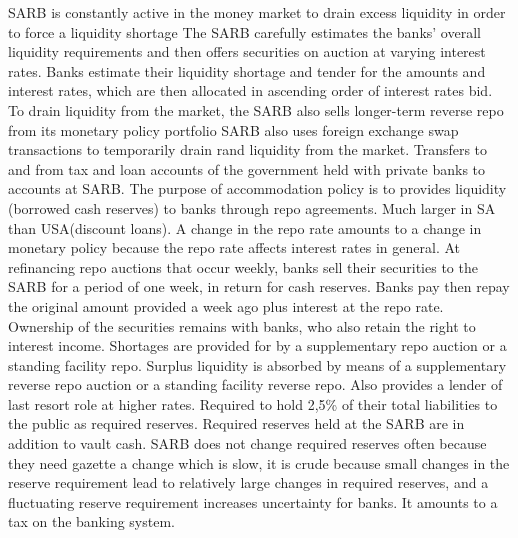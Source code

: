 \documentclass[12pt]{examnotes}
\begin{document}
\ra SARB is constantly active in the money market to drain excess liquidity in order to force a liquidity shortage
\ra The SARB carefully estimates the banks' overall liquidity requirements and then offers securities on auction at varying interest rates. Banks estimate their liquidity shortage and tender for the amounts and interest rates, which are then allocated in ascending order of interest rates bid.
\ra To drain liquidity from the market, the SARB also sells longer-term reverse repo from its monetary policy portfolio
\ra SARB also uses foreign exchange swap transactions to temporarily drain rand liquidity from the market.
\ra Transfers to and from tax and loan accounts of the government held with private banks to accounts at SARB.
\ra The purpose of accommodation policy is to provides liquidity (borrowed cash reserves) to banks through repo agreements. Much larger in SA than USA(discount loans).
\ra A change in the repo rate amounts to a change in monetary policy because the repo rate affects interest rates in general.
\ra At refinancing repo auctions that occur weekly, banks sell their securities to the SARB for a period of one week, in return for cash reserves. Banks pay then repay the original amount provided a week ago plus interest at the repo rate. 
\ra Ownership of the securities remains with banks, who also retain the right to interest income.
\ra Shortages are provided for by a supplementary repo auction or a standing facility repo.
\ra Surplus liquidity is absorbed by means of a supplementary reverse repo auction or a standing facility reverse repo.
\ra Also provides a lender of last resort role at higher rates.
\ra Required to hold 2,5\% of their total liabilities to the public as required reserves.
\ra Required reserves held at the SARB are in addition to vault cash.
\ra SARB does not change required reserves often because they need gazette a change which is slow, it is crude because small changes in the reserve requirement lead to relatively large changes in required reserves, and a fluctuating reserve requirement increases uncertainty for banks. It amounts to a tax on the banking system.
\end{document}
